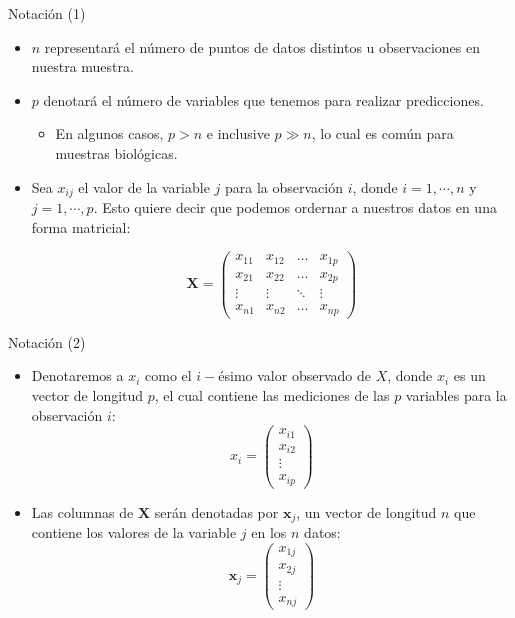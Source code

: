 \documentclass[usenames,dvipsnames]{beamer} %
\newcommand{\matr}[1]{\mathbf{#1}}
\begin{document}
\begin{frame}{Notaci\'on (1)}
    \begin{itemize}
        \item $n$ representar\'a el n\'umero de puntos de datos distintos u observaciones en nuestra muestra.
        \item $p$ denotar\'a el n\'umero de variables que tenemos para realizar predicciones. 
        \begin{itemize}
            \item En algunos casos, $p>n$ e inclusive $p\gg n$, lo cual es com\'un para muestras biol\'ogicas.
        \end{itemize}
        \item Sea $x_{ij}$ el valor de la variable $j$ para la observaci\'on $i$, donde $i=1,\cdots, n$ y $j=1,\cdots,p$. Esto quiere decir que podemos ordernar a nuestros datos en una forma matricial:
        
        $$ \matr{X} = \begin{pmatrix} 
                    x_{11} & x_{12} & \dots & x_{1p} \\
                    x_{21} & x_{22} & \dots & x_{2p} \\
                    \vdots & \vdots & \ddots & \vdots\\
                    x_{n1} & x_{n2} & \dots & x_{np}
        \end{pmatrix} $$
    \end{itemize}
\end{frame}

\begin{frame}{Notaci\'on (2)}
    \begin{itemize}
        \item Denotaremos a $x_i$ como el $i-$\'esimo valor observado de $X$, donde $x_{i}$ es un vector de longitud $p$, el cual contiene las mediciones de las $p$ variables para la observaci\'on $i$:
        $$ x_{i} = \begin{pmatrix}
                    x_{i1}\\
                    x_{i2}\\
                    \vdots\\
                    x_{ip}
                    \end{pmatrix}$$
        \item Las columnas de $\matr{X}$ ser\'an denotadas por $\matr{x}_{j}$, un vector de longitud $n$ que contiene los valores de la variable $j$ en los $n$ datos:
        $$ \matr{x}_{j} = \begin{pmatrix}
                    x_{1j}\\
                    x_{2j}\\
                    \vdots\\
                    x_{nj}
                    \end{pmatrix}$$
    \end{itemize}
\end{frame}
\end{document}

